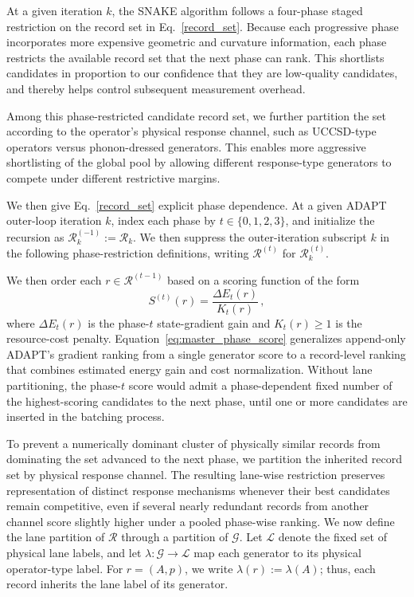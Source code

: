 \documentclass[
  reprint,
  amsmath,
  amssymb,
  aps,
  pra,
  nofootinbib,
  superscriptaddress,
  floatfix
]{revtex4-2}
\begin{document}
At a given iteration \(k\), the \textsc{SNAKE} algorithm follows a four-phase staged restriction on the record set in Eq.~\eqref{record_set}. Because each progressive phase incorporates more expensive geometric and curvature information, each phase restricts the available record set that the next phase can rank. This shortlists candidates in proportion to our confidence that they are low-quality candidates, and thereby helps control subsequent measurement overhead.

Among this phase-restricted candidate record set, we further partition the set according to the operator's physical response channel, such as UCCSD-type operators versus phonon-dressed generators. This enables more aggressive shortlisting of the global pool by allowing different response-type generators to compete under different restrictive margins.

We then give Eq.~\eqref{record_set} explicit phase dependence. At a given ADAPT outer-loop iteration \(k\), index each phase by \(t\in\{0,1,2,3\}\), and initialize the recursion as \(\mathcal R_k^{(-1)}:=\mathcal R_k\). We then suppress the outer-iteration subscript \(k\) in the following phase-restriction definitions, writing \(\mathcal R^{(t)}\) for \(\mathcal R_k^{(t)}\).

We then order each \(r\in\mathcal R^{(t-1)}\) based on a scoring function of the form
\begin{equation}
S^{(t)}(r)
=
\frac{\Delta E_t(r)}{K_t(r)}\,,
\label{eq:master_phase_score}
\end{equation}
where \(\Delta E_t(r)\) is the phase-\(t\) state-gradient gain and
\(K_t(r)\geq 1\) is the resource-cost
penalty. Equation~\eqref{eq:master_phase_score} generalizes append-only
ADAPT's gradient ranking from a single generator score to a record-level
ranking that combines estimated energy gain and cost normalization.
Without lane partitioning, the phase-\(t\) score would admit a phase-dependent
fixed number of the highest-scoring candidates to the next phase, until one or
more candidates are inserted in the batching process.

To prevent a numerically dominant cluster of physically similar records from
dominating the set advanced to the next phase, we partition the inherited record
set by physical response channel. The resulting lane-wise restriction preserves
representation of distinct response mechanisms whenever their best candidates
remain competitive, even if several nearly redundant records from another
channel score slightly higher under a pooled phase-wise ranking. We now define
the lane partition of \(\mathcal R\) through a partition of \(\mathcal G\). Let
\(\mathcal L\) denote the fixed set of physical lane labels, and let
\(\lambda:\mathcal G\to\mathcal L\) map each generator to its physical
operator-type label. For \(r=(A,p)\), we write
\(\lambda(r):=\lambda(A)\); thus, each record inherits the lane label of its
generator.
\end{document}
